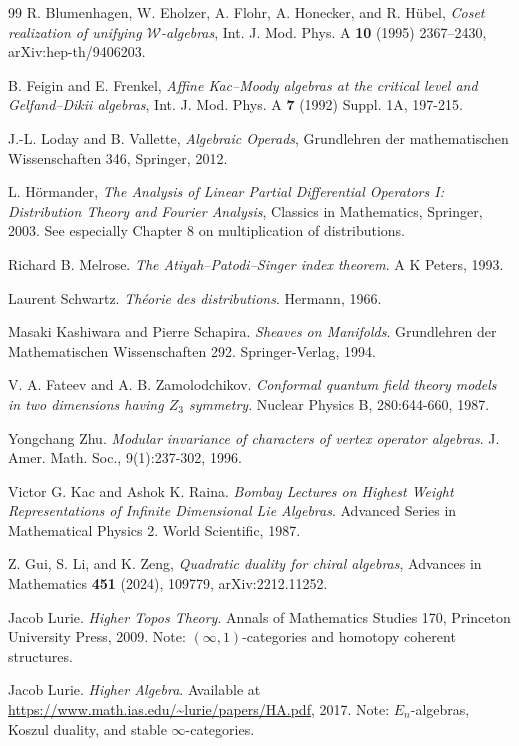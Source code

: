 \begin{thebibliography}{99}
R. Blumenhagen, W. Eholzer, A. Flohr, A. Honecker, and R. H\"ubel,
\emph{Coset realization of unifying $\mathcal{W}$-algebras},
Int. J. Mod. Phys. A \textbf{10} (1995) 2367--2430, arXiv:hep-th/9406203.

B. Feigin and E. Frenkel, \emph{Affine Kac--Moody algebras at the critical level and Gelfand--Dikii algebras},
Int. J. Mod. Phys. A \textbf{7} (1992) Suppl. 1A, 197-215.

 J.-L. Loday and B. Vallette,
\emph{Algebraic Operads},
Grundlehren der mathematischen Wissenschaften 346, Springer, 2012.

 L. Hörmander,
\emph{The Analysis of Linear Partial Differential Operators I: Distribution Theory and Fourier Analysis},
Classics in Mathematics, Springer, 2003.
See especially Chapter 8 on multiplication of distributions.

Richard B. Melrose.
\textit{The Atiyah--Patodi--Singer index theorem}.
A K Peters, 1993.

Laurent Schwartz.
\textit{Théorie des distributions}.
Hermann, 1966.

Masaki Kashiwara and Pierre Schapira.
\textit{Sheaves on Manifolds}.
Grundlehren der Mathematischen Wissenschaften 292.
Springer-Verlag, 1994.

V. A. Fateev and A. B. Zamolodchikov.
\textit{Conformal quantum field theory models in two dimensions having $Z_3$ symmetry}.
Nuclear Physics B, 280:644-660, 1987.

Yongchang Zhu.
\textit{Modular invariance of characters of vertex operator algebras}.
J. Amer. Math. Soc., 9(1):237-302, 1996.

Victor G. Kac and Ashok K. Raina.
\textit{Bombay Lectures on Highest Weight Representations of Infinite Dimensional Lie Algebras}.
Advanced Series in Mathematical Physics 2.
World Scientific, 1987.


Z. Gui, S. Li, and K. Zeng, \emph{Quadratic duality for chiral algebras},
Advances in Mathematics \textbf{451} (2024), 109779, arXiv:2212.11252.

Jacob Lurie.
\textit{Higher Topos Theory}.
Annals of Mathematics Studies 170, Princeton University Press, 2009.
Note: $(\infty,1)$-categories and homotopy coherent structures.

Jacob Lurie.
\textit{Higher Algebra}.
Available at \url{https://www.math.ias.edu/~lurie/papers/HA.pdf}, 2017.
Note: $E_n$-algebras, Koszul duality, and stable $\infty$-categories.


\end{thebibliography}
